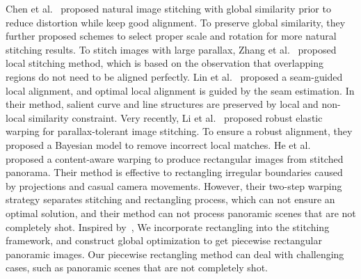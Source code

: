 \documentclass[10pt,journal,compsoc]{IEEEtran}
\begin{document}
Chen et al.~\cite{conf/eccv/ChenC16} proposed natural image stitching with global similarity prior to reduce distortion while keep good alignment.
To preserve global similarity, they further proposed schemes to select proper scale and rotation for more natural stitching results.
To stitch images with large parallax, Zhang et al.~\cite{conf/cvpr/ZhangL14a} proposed local stitching method, which is based on the observation that overlapping regions do not need to be aligned perfectly.
Lin et al.~\cite{conf/eccv/LinJCDL16} proposed a seam-guided local alignment, and optimal local alignment is guided by the seam estimation.
In their method, salient curve and line structures are preserved by local and non-local similarity constraint.
Very recently, Li et al.~\cite{journals/tmm/LiWLZZ18} proposed robust elastic warping for parallax-tolerant image stitching. To ensure a robust alignment, they proposed a Bayesian model to remove incorrect local matches.
He et al.~\cite{journals/tog/HeC013} proposed a content-aware warping to produce rectangular images from stitched panorama.  Their method is effective to rectangling irregular boundaries caused by projections and casual camera movements. However, their two-step warping strategy separates stitching and rectangling process, which can not ensure an optimal solution, and their method can not process panoramic scenes that are not completely shot.
Inspired by~\cite{journals/tog/HeC013}, We incorporate rectangling into the stitching framework, and construct global optimization to get piecewise rectangular panoramic images.
Our piecewise rectangling method can  deal with challenging cases, such as panoramic scenes that are not completely shot.
\end{document}
